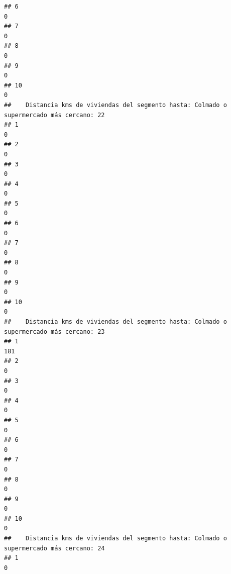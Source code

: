 \documentclass[11pt,]{article}
\begin{document}
\begin{verbatim}
## 6                                                                                      0
## 7                                                                                      0
## 8                                                                                      0
## 9                                                                                      0
## 10                                                                                     0
##    Distancia kms de viviendas del segmento hasta: Colmado o supermercado más cercano: 22
## 1                                                                                      0
## 2                                                                                      0
## 3                                                                                      0
## 4                                                                                      0
## 5                                                                                      0
## 6                                                                                      0
## 7                                                                                      0
## 8                                                                                      0
## 9                                                                                      0
## 10                                                                                     0
##    Distancia kms de viviendas del segmento hasta: Colmado o supermercado más cercano: 23
## 1                                                                                    181
## 2                                                                                      0
## 3                                                                                      0
## 4                                                                                      0
## 5                                                                                      0
## 6                                                                                      0
## 7                                                                                      0
## 8                                                                                      0
## 9                                                                                      0
## 10                                                                                     0
##    Distancia kms de viviendas del segmento hasta: Colmado o supermercado más cercano: 24
## 1                                                                                      0

\end{verbatim}
\end{document}
